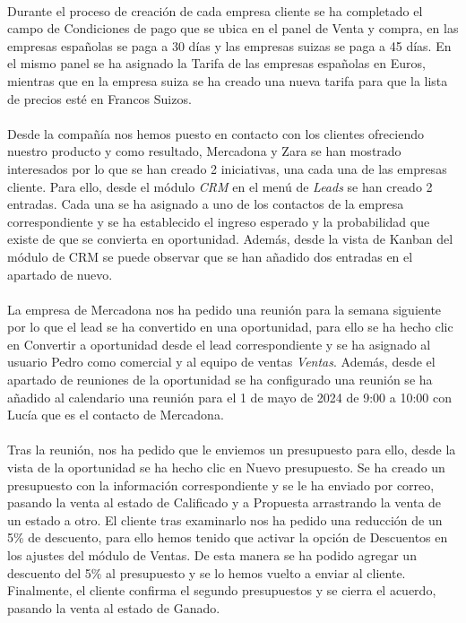 \paragraph{}
Durante el proceso de creación de cada empresa cliente se ha completado el campo de Condiciones de pago que se ubica en el panel de Venta y compra, en las empresas españolas se paga a 30 días  y las empresas suizas se paga a 45 días. En el mismo panel se ha asignado la Tarifa de las empresas españolas en Euros, mientras que en la empresa suiza se ha creado una nueva tarifa para que la lista de precios esté en Francos Suizos.
\paragraph{}
Desde la compañía nos hemos puesto en contacto con los clientes ofreciendo nuestro producto y como resultado, Mercadona y Zara se han mostrado interesados por lo que se han creado 2 iniciativas, una cada una de las empresas cliente. Para ello, desde el módulo \textit{CRM} en el menú de \textit{Leads} se han creado 2 entradas. Cada una se ha asignado a uno de los contactos de la empresa correspondiente y se ha establecido el ingreso esperado y la probabilidad que existe de que se convierta en oportunidad.
Además, desde la vista de Kanban del módulo de CRM se puede observar que se han añadido dos entradas en el apartado de nuevo.
\paragraph{}
La empresa de Mercadona nos ha pedido una reunión para la semana siguiente por lo que el lead se ha convertido en una oportunidad, para ello se ha hecho clic en Convertir a oportunidad desde el lead correspondiente y se ha asignado al usuario Pedro como comercial y al equipo de ventas \textit{Ventas}. Además, desde el apartado de reuniones de la oportunidad se ha configurado una reunión se ha añadido al calendario una reunión para el 1 de mayo de 2024 de 9:00 a 10:00 con Lucía que es el contacto de Mercadona.
\paragraph{}
Tras la reunión, nos ha pedido que le enviemos un presupuesto para ello, desde la vista de la oportunidad se ha hecho clic en Nuevo presupuesto. Se ha creado un presupuesto con la información correspondiente y se le ha enviado por correo, pasando la venta al estado de Calificado y a Propuesta arrastrando la venta de un estado a otro. El cliente tras examinarlo nos ha pedido una reducción de un 5\% de descuento, para ello hemos tenido que activar la opción de Descuentos en los ajustes del módulo de Ventas. De esta manera se ha podido agregar un descuento del 5\% al presupuesto y se lo hemos vuelto a enviar al cliente. Finalmente, el cliente confirma el segundo presupuestos y se cierra el acuerdo, pasando la venta al estado de Ganado.
